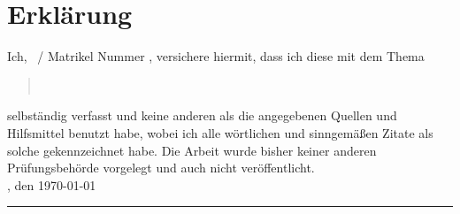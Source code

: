 \setlength{\parindent}{0pt}

\chapter*{Erklärung}
\label{cha:erklaerung}


Ich, \autor\ / Matrikel Nummer \matrikelnr, versichere hiermit, dass ich diese \art{} mit dem Thema
\begin{quote}
\centering
\large{\textit{\titel}}\\
\normalsize{\textit{\untertitel}}
\end{quote}
selbständig verfasst und keine anderen als die angegebenen Quellen und Hilfsmittel benutzt habe, wobei ich alle wörtlichen und sinngem\"a\ss{}en Zitate als solche gekennzeichnet habe. Die Arbeit wurde bisher keiner anderen Prüfungsbehörde vorgelegt und auch nicht veröffentlicht.\\[1ex]

\ort, den \today \\[1ex]

\rule[-0.2cm]{7cm}{0.5pt}\\
\small{\textit{\autor}} \\[1ex]
\setlength{\parindent}{15pt}